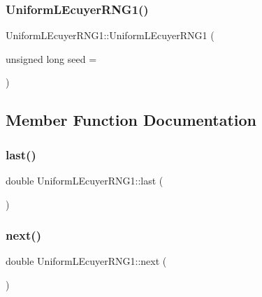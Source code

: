 \subsubsection{\texorpdfstring{Uniform\+L\+Ecuyer\+R\+N\+G1()}{UniformLEcuyerRNG1()}}
{\footnotesize\ttfamily Uniform\+L\+Ecuyer\+R\+N\+G1\+::\+Uniform\+L\+Ecuyer\+R\+N\+G1 (\begin{DoxyParamCaption}\item[{unsigned long}]{seed = {} }\end{DoxyParamCaption})\hspace{0.3cm}{\ttfamily [explicit]}}



\subsection{Member Function Documentation}
\hypertarget{class_uniform_l_ecuyer_r_n_g1_aaed8bab7d34f76064ca34b1d35b204f4}{}\label{class_uniform_l_ecuyer_r_n_g1_aaed8bab7d34f76064ca34b1d35b204f4} 
\subsubsection{\texorpdfstring{last()}{last()}}
{\footnotesize\ttfamily double Uniform\+L\+Ecuyer\+R\+N\+G1\+::last (\begin{DoxyParamCaption}{ }\end{DoxyParamCaption})\hspace{0.3cm}{\ttfamily [inline]}}

\hypertarget{class_uniform_l_ecuyer_r_n_g1_a6a166e0bef412d4c85565ec0017ae489}{}\label{class_uniform_l_ecuyer_r_n_g1_a6a166e0bef412d4c85565ec0017ae489} 
\subsubsection{\texorpdfstring{next()}{next()}}
{\footnotesize\ttfamily double Uniform\+L\+Ecuyer\+R\+N\+G1\+::next (\begin{DoxyParamCaption}{ }\end{DoxyParamCaption})}

\hypertarget{class_uniform_l_ecuyer_r_n_g1_a33e1ea51eb633a14e84d45d8c31a4e8b}{}\label{class_uniform_l_ecuyer_r_n_g1_a33e1ea51eb633a14e84d45d8c31a4e8b} 
